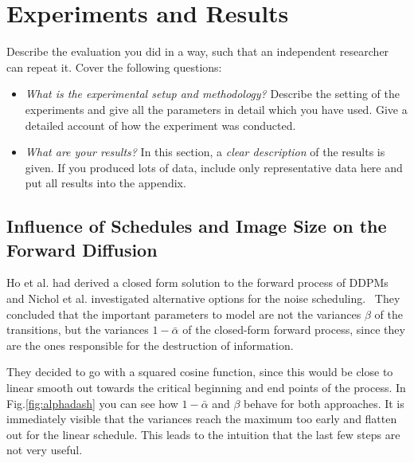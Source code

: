 %
\newpage
\chapter{Experiments and Results}
Describe the evaluation you did in a way, such that an independent researcher can repeat it. Cover the following questions:
\begin{itemize}
    \item \textit{What is the experimental setup and methodology?} Describe the setting of the experiments and give all the parameters in detail which you have used. Give a detailed account of how the experiment was conducted.
    \item \textit{What are your results?} In this section, a \emph{clear description} of the results is given. If you produced lots of data, include only representative data here and put all results into the appendix.
\end{itemize}

\section{Influence of Schedules and Image Size on the Forward Diffusion}
\label{sec:forward_diff_experiments}
Ho et al. had derived a closed form solution to the forward process of DDPMs and Nichol et al. investigated alternative options for the noise scheduling.~\autocite{ho2020denoising,nichol2021improved} They concluded that the important parameters to model are not the variances $\beta$ of the transitions, but the variances $1-\bar{\alpha}$ of the closed-form forward process, since they are the ones responsible for the destruction of information.

They decided to go with a squared cosine function, since this would be close to linear smooth out towards the critical beginning and end points of the process. In Fig.\ref{fig:alphadash} you can see how $1-\bar{\alpha}$ and $\beta$ behave for both approaches. It is immediately visible that the variances reach the maximum too early and flatten out for the linear schedule. This leads to the intuition that the last few steps are not very useful.

